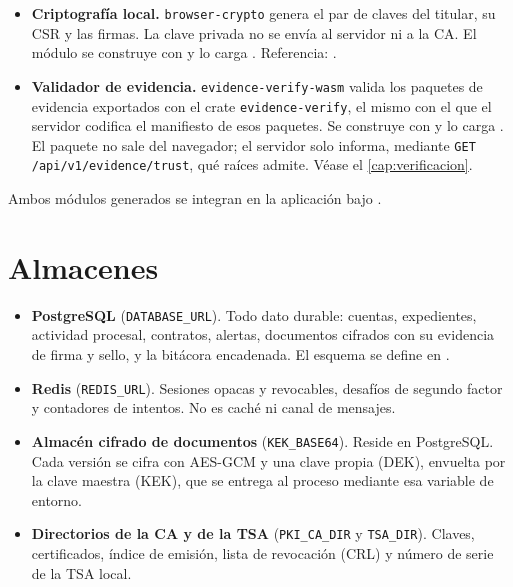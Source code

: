 \begin{itemize}
  \item \textbf{Criptografía local.} \texttt{browser-crypto} genera el par de
    claves del titular, su CSR y las firmas. La clave privada no se envía al
    servidor ni a la CA. El módulo se construye con
     y lo carga
    . Referencia:
    .
  \item \textbf{Validador de evidencia.} \texttt{evidence-verify-wasm} valida
    los paquetes de evidencia exportados con el crate
    \texttt{evidence-verify}, el mismo con el que el servidor codifica el
    manifiesto de esos paquetes. Se construye con
     y lo carga
    . El
    paquete no sale del navegador; el servidor solo informa, mediante
    \texttt{GET /api/v1/evidence/trust}, qué raíces admite. Véase el
    \cref{cap:verificacion}.
\end{itemize}

Ambos módulos generados se integran en la aplicación bajo
.

\section{Almacenes}\label{sec:arq-almacenes}

\begin{itemize}
  \item \textbf{PostgreSQL} (\texttt{DATABASE\_URL}). Todo dato durable:
    cuentas, expedientes, actividad procesal, contratos, alertas, documentos
    cifrados con su evidencia de firma y sello, y la bitácora encadenada. El
    esquema se define en .
  \item \textbf{Redis} (\texttt{REDIS\_URL}). Sesiones opacas y revocables,
    desafíos de segundo factor y contadores de intentos. No es caché ni canal
    de mensajes.
  \item \textbf{Almacén cifrado de documentos} (\texttt{KEK\_BASE64}). Reside
    en PostgreSQL. Cada versión se cifra con AES-GCM y una clave propia (DEK),
    envuelta por la clave maestra (KEK), que se entrega al proceso mediante
    esa variable de entorno.
  \item \textbf{Directorios de la CA y de la TSA} (\texttt{PKI\_CA\_DIR} y
    \texttt{TSA\_DIR}). Claves, certificados, índice de emisión, lista de
    revocación (CRL) y número de serie de la TSA local.
\end{itemize}

